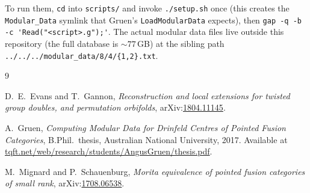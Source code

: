 \documentclass[11pt,a4paper]{amsart}
\theoremstyle{plain}
\theoremstyle{definition}
\begin{document}
\noindent
To run them, \verb|cd| into \verb|scripts/| and invoke
\verb|./setup.sh| once (this creates the \verb|Modular_Data| symlink
that Gruen's \verb|LoadModularData| expects), then
\verb|gap -q -b -c 'Read("<script>.g");'|. The actual modular data
files live outside this repository (the full database is $\sim 77$\,GB)
at the sibling path \verb|../../../modular_data/8/4/{1,2}.txt|.

\begin{thebibliography}{9}

D.~E.~Evans and T.~Gannon,
\emph{Reconstruction and local extensions for twisted group doubles,
and permutation orbifolds},
arXiv:\href{https://arxiv.org/abs/1804.11145}{1804.11145}.

A.~Gruen,
\emph{Computing Modular Data for Drinfeld Centres of Pointed Fusion
Categories},
B.Phil.\ thesis, Australian National University, 2017.
Available at
\href{https://tqft.net/web/research/students/AngusGruen/thesis.pdf}%
{tqft.net/web/research/students/AngusGruen/thesis.pdf}.

M.~Mignard and P.~Schauenburg,
\emph{Morita equivalence of pointed fusion categories of small rank},
arXiv:\href{https://arxiv.org/abs/1708.06538}{1708.06538}.

\end{thebibliography}
\end{document}

